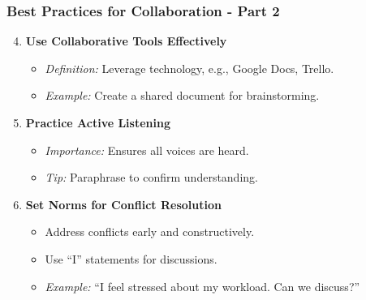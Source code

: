 \documentclass[aspectratio=169]{beamer}
\begin{document}
\begin{frame}[fragile]
    \frametitle{Best Practices for Collaboration - Part 2}
    \begin{enumerate}
        \setcounter{enumi}{3} %
        \item \textbf{Use Collaborative Tools Effectively}
            \begin{itemize}
                \item \textit{Definition:} Leverage technology, e.g., Google Docs, Trello.
                \item \textit{Example:} Create a shared document for brainstorming.
            \end{itemize}

        \item \textbf{Practice Active Listening}
            \begin{itemize}
                \item \textit{Importance:} Ensures all voices are heard.
                \item \textit{Tip:} Paraphrase to confirm understanding.
            \end{itemize}

        \item \textbf{Set Norms for Conflict Resolution}
            \begin{itemize}
                \item Address conflicts early and constructively.
                \item Use “I” statements for discussions.
                \item \textit{Example:} “I feel stressed about my workload. Can we discuss?” 
            \end{itemize}
    \end{enumerate}
\end{frame}
\end{document}
